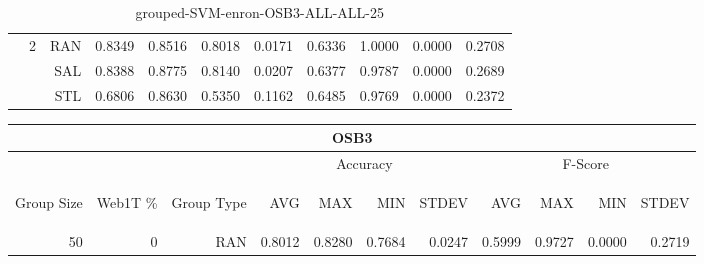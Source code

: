 \begin{center}
\begin{table}[htbp]
\begin{center}
\begin{tabular}{ | r | r | r | r | r | r | r | r | r | r | r |}
 & \multirow{3}{*}{2} & RAN & 0.8349 & 0.8516 & 0.8018 & 0.0171 & 0.6336 & 1.0000 & 0.0000 & 0.2708\\ \cline{3-11}
 &   & SAL & 0.8388 & 0.8775 & 0.8140 & 0.0207 & 0.6377 & 0.9787 & 0.0000 & 0.2689\\ \cline{3-11}
 &   & STL & 0.6806 & 0.8630 & 0.5350 & 0.1162 & 0.6485 & 0.9769 & 0.0000 & 0.2372\\ \cline{2-11}
\hline
\end{tabular}
\caption{grouped-SVM-enron-OSB3-ALL-ALL-25}
\end{center}
 \end{table}
\end{center}

\begin{center}
\begin{table}[htbp] 
 \begin{center}
\begin{tabular}{ | r | r | r | r | r | r | r | r | r | r | r |}
\hline
\multicolumn{11}{|c|}{OSB3}\\
\hline
 & & & \multicolumn{4}{|c|}{Accuracy} & \multicolumn{4}{|c|}{F-Score}\\ \cline{4-11}
\begin{sideways}Group Size\end{sideways} & \begin{sideways}Web1T \%\end{sideways} & \begin{sideways}Group Type\end{sideways} & \begin{sideways}AVG\end{sideways} & \begin{sideways}MAX\end{sideways} & \begin{sideways}MIN\end{sideways} & \begin{sideways}STDEV\end{sideways} & \begin{sideways}AVG\end{sideways} & \begin{sideways}MAX\end{sideways} & \begin{sideways}MIN\end{sideways} & \begin{sideways}STDEV\end{sideways}\\
\hline
\multirow{6}{*}{50}
 & \multirow{3}{*}{0} & RAN & 0.8012 & 0.8280 & 0.7684 & 0.0247 & 0.5999 & 0.9727 & 0.0000 & 0.2719\\ \cline{3-11}

\end{tabular}
\end{center}
\end{table}
\end{center}
